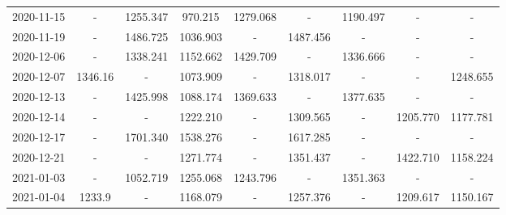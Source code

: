 \begin{table*}[t]
\begin{tabular}{ccccccccc}
2020-11-15 &        - &                        1255.347 &   {\cellcolor{blue!25} 970.215} &        1279.068 &         - &  1190.497 &         - &                               - \\
2020-11-19 &        - &                        1486.725 &  {\cellcolor{blue!25} 1036.903} &               - &  1487.456 &         - &         - &                               - \\
2020-12-06 &        - &                        1338.241 &  {\cellcolor{blue!25} 1152.662} &        1429.709 &         - &  1336.666 &         - &                               - \\
2020-12-07 &  1346.16 &                               - &  {\cellcolor{blue!25} 1073.909} &               - &  1318.017 &         - &         - &                        1248.655 \\
2020-12-13 &        - &                        1425.998 &  {\cellcolor{blue!25} 1088.174} &        1369.633 &         - &  1377.635 &         - &                               - \\
2020-12-14 &        - &                               - &                        1222.210 &               - &  1309.565 &         - &  1205.770 &  {\cellcolor{blue!25} 1177.781} \\
2020-12-17 &        - &                        1701.340 &  {\cellcolor{blue!25} 1538.276} &               - &  1617.285 &         - &         - &                               - \\
2020-12-21 &        - &                               - &                        1271.774 &               - &  1351.437 &         - &  1422.710 &  {\cellcolor{blue!25} 1158.224} \\
2021-01-03 &        - &  {\cellcolor{blue!25} 1052.719} &                        1255.068 &        1243.796 &         - &  1351.363 &         - &                               - \\
2021-01-04 &   1233.9 &                               - &                        1168.079 &               - &  1257.376 &         - &  1209.617 &  {\cellcolor{blue!25} 1150.167} \\
\bottomrule
\end{tabular}

\end{table*}
